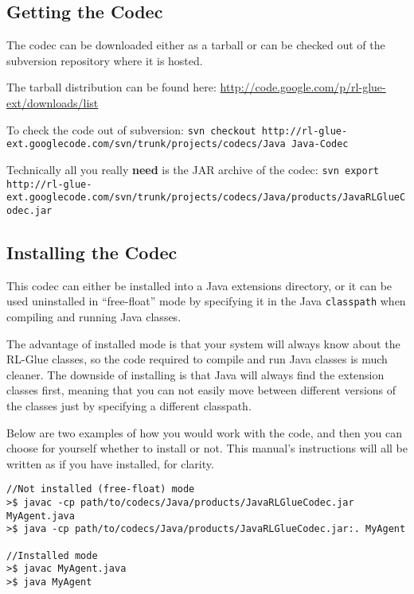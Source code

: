 \documentclass[11pt]{article}
\begin{document}
\subsection{Getting the Codec}
The codec can be downloaded either as a tarball or can be checked out of the subversion repository where it is hosted.

The tarball distribution can be found here:\newline
\url{http://code.google.com/p/rl-glue-ext/downloads/list}


To check the code out of subversion:\newline
\texttt{svn checkout http://rl-glue-ext.googlecode.com/svn/trunk/projects/codecs/Java Java-Codec}

Technically all you really \textbf{need} is the JAR archive of the codec:\newline
\footnotesize \texttt{svn export http://rl-glue-ext.googlecode.com/svn/trunk/projects/codecs/Java/products/JavaRLGlueCodec.jar} \normalsize

\subsection{Installing the Codec}
This codec can either be installed into a Java extensions directory, or it can be used uninstalled in ``free-float'' mode by specifying it in the Java \texttt{classpath} when compiling and running Java classes.

The advantage of installed mode is that your system will always know about the RL-Glue classes, so the code required to compile and run Java classes is much cleaner.  The downside of installing is that Java will always find the extension classes first, meaning that you can not easily move between different versions of the classes just by specifying a different classpath.

Below are two examples of how you would work with the code, and then you can choose for yourself whether to install or not.  This manual's instructions will all be written as if you have installed, for clarity.

\begin{verbatim}
//Not installed (free-float) mode
>$ javac -cp path/to/codecs/Java/products/JavaRLGlueCodec.jar MyAgent.java
>$ java -cp path/to/codecs/Java/products/JavaRLGlueCodec.jar:. MyAgent

//Installed mode
>$ javac MyAgent.java
>$ java MyAgent
\end{verbatim}
\end{document}
